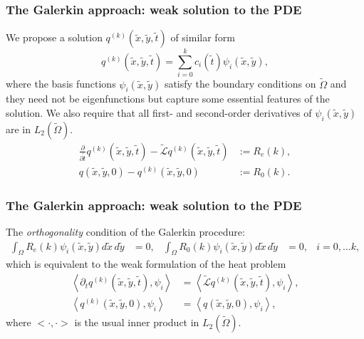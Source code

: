 \documentclass{beamer}
\begin{document}
\begin{frame}
  \frametitle{The Galerkin approach: weak solution to the PDE}
  We propose a solution $q^{(k)}(\tilde{x},\tilde{y},\tilde{t})$ of similar
  form
  \[
    q^{(k)}(\tilde{x},\tilde{y},\tilde{t}) = \sum_{i=0}^k c_i(\tilde{t})
    \psi_i(\tilde{x},\tilde{y}),
  \]
  where the basis functions $\psi_i(\tilde{x},\tilde{y})$ satisfy the
  boundary conditions on $\tilde{\Omega}$ and they need not be
  eigenfunctions but capture some essential features of the
  solution. We also require that all first- and second-order
  derivatives of $\psi_i(\tilde{x},\tilde{y})$ are in
  $L_2(\tilde{\Omega})$.
  \begin{align*}
  \frac{\partial}{\partial \tilde{t}} q^{(k)}(\tilde{x},\tilde{y},\tilde{t}) - \tilde{\mathcal{L}}q^{(k)}(\tilde{x},\tilde{y},\tilde{t}) &:= R_e(k), \\
  q(\tilde{x},\tilde{y},0) - q^{(k)}(\tilde{x},\tilde{y},0) &:= R_0(k).
  \end{align*}
\end{frame}
\begin{frame}
  \frametitle{The Galerkin approach: weak solution to the PDE} The
  \textit{orthogonality} condition of the Galerkin procedure:
  \begin{align*}
    \displaystyle \int_{\Omega} R_e(k) \psi_i(\tilde{x},\tilde{y}) d\tilde{x}\,d\tilde{y} &= 0,& \displaystyle \int_{\Omega} R_0(k) \psi_i(\tilde{x},\tilde{y}) d\tilde{x}\,d\tilde{y} &= 0,& i = 0,\ldots k, 
  \end{align*}
  which is equivalent to the weak formulation of the heat problem
  \begin{align*}
    \left< \partial_t q^{(k)}(\tilde{x},\tilde{y},\tilde{t}), \psi_i \right> &= \left<\tilde{\mathcal{L}}q^{(k)}(\tilde{x},\tilde{y},\tilde{t}), \psi_i \right>, \\
    \left< q^{(k)}(\tilde{x},\tilde{y},0), \psi_i \right> &= \left<q(\tilde{x},\tilde{y},0), \psi_i\right>,
  \end{align*}
  where $<\cdot, \cdot>$ is the usual inner product in
  $L_2(\tilde{\Omega})$.
\end{frame}
\end{document}

